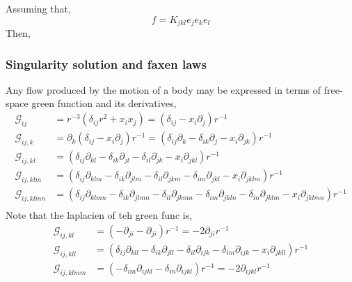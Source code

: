 Assuming that, 
\begin{equation}
    f = K_{jkl} e_je_ke_l 
\end{equation}
Then, 

\subsubsection{Singularity solution and faxen laws}
Any flow produced by the motion of a body may be expressed in terms of free-space green function and its derivatives,
\begin{align}
    \mathcal{G}_{ij}
    &=
    r^{-3}(\delta_{ij} r^2 + x_ix_j)
    =
    (\delta_{ij} - x_i \partial_j )r^{-1}\\
    \mathcal{G}_{ij,k}
    &=
    \partial_k (\delta_{ij} - x_i \partial_j )r^{-1}
    =(\delta_{ij}\partial_k  
    - \delta_{ik} \partial_j  
    - x_i \partial_{jk} )r^{-1}\\
    \mathcal{G}_{ij,kl}
    &=(
        \delta_{ij} \partial_{kl} 
    - \delta_{ik} \partial_{jl}  
    - \delta_{il} \partial_{jk}
    - x_i \partial_{jkl}
    )r^{-1}\\
    \mathcal{G}_{ij,klm}
    &=(
        \delta_{ij} \partial_{klm} 
    - \delta_{ik} \partial_{jlm}  
    - \delta_{il} \partial_{jkm}
    - \delta_{im} \partial_{jkl}
    - x_i \partial_{jklm}
    )r^{-1}\\
    \mathcal{G}_{ij,klmn}
    &=(
    \delta_{ij} \partial_{klmn} 
    - \delta_{ik} \partial_{jlmn}  
    - \delta_{il} \partial_{jkmn}
    - \delta_{im} \partial_{jkln}
    - \delta_{in} \partial_{jklm}
    - x_i \partial_{jklmn}
    )r^{-1}\\
\end{align}
Note that the laplacien of teh green func is, 
\begin{align}
    \mathcal{G}_{ij,kl}
    &=(
    -  \partial_{ji}  
    - \partial_{ji}
    )r^{-1}
    = -2 \partial_{ji}r^{-1}\\
    \mathcal{G}_{ij,kll}
    &=(
        \delta_{ij} \partial_{kll} 
    - \delta_{ik} \partial_{jll}  
    - \delta_{il} \partial_{ijk}
    - \delta_{im} \partial_{ijk}
    - x_i \partial_{jkll}
    )r^{-1}\\
    \mathcal{G}_{ij,klmm}
    &=(
    - \delta_{im} \partial_{ijkl}
    - \delta_{in} \partial_{ijkl}
    )r^{-1}
    = -2 \partial_{ijkl}r^{-1}
\end{align}

